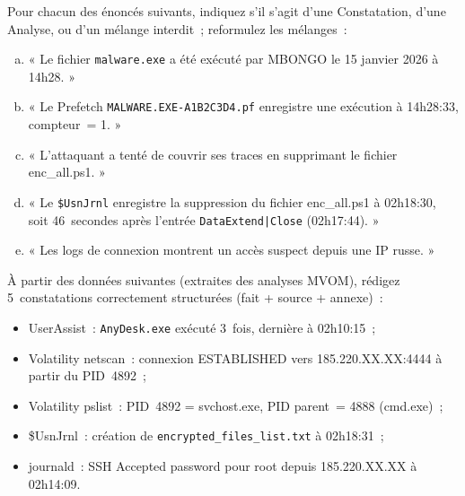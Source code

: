 \begin{boxexo}[title={\ding{45}\quad Exercice~19.1 --- Identifier constatation vs analyse \niveaubase}]
Pour chacun des énoncés suivants, indiquez s'il s'agit d'une
Constatation, d'une Analyse, ou d'un mélange interdit~; reformulez
les mélanges~:
\begin{enumerate}[(a)]
    \item « Le fichier \texttt{malware.exe} a été exécuté par
          MBONGO le 15 janvier 2026 à 14h28. »
    \item « Le Prefetch \texttt{MALWARE.EXE-A1B2C3D4.pf} enregistre
          une exécution à 14h28:33, compteur~= 1. »
    \item « L'attaquant a tenté de couvrir ses traces en supprimant
          le fichier enc\_all.ps1. »
    \item « Le \texttt{\$UsnJrnl} enregistre la suppression du
          fichier enc\_all.ps1 à 02h18:30, soit 46~secondes après
          l'entrée \texttt{DataExtend|Close} (02h17:44). »
    \item « Les logs de connexion montrent un accès suspect
          depuis une IP russe. »
\end{enumerate}
\end{boxexo}

\begin{boxexo}[title={\ding{45}\quad Exercice~19.2 --- Rédiger une section Constatations \niveaumoyen}]
À partir des données suivantes (extraites des analyses MVOM),
rédigez 5~constatations correctement structurées (fait + source
+ annexe)~:
\begin{itemize}
    \item UserAssist~: \texttt{AnyDesk.exe} exécuté 3~fois,
          dernière à 02h10:15~;
    \item Volatility netscan~: connexion ESTABLISHED vers
          185.220.XX.XX:4444 à partir du PID~4892~;
    \item Volatility pslist~: PID~4892 = svchost.exe,
          PID parent~= 4888 (cmd.exe)~;
    \item \$UsnJrnl~: création de \texttt{encrypted\_files\_list.txt}
          à 02h18:31~;
    \item journald~: SSH Accepted password pour root depuis
          185.220.XX.XX à 02h14:09.
\end{itemize}
\end{boxexo}

